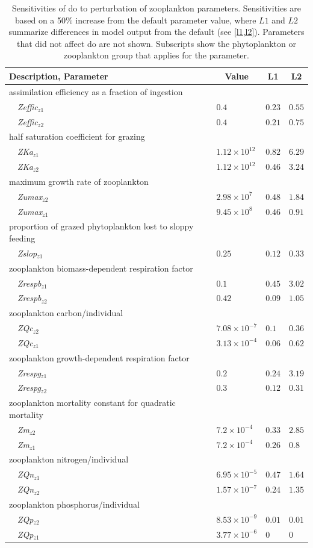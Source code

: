 \documentclass[letterpaper,12pt,oneside]{article}\usepackage[]{graphicx}\usepackage[]{color}
\begin{document}
\begin{table}[!tbp]
{\normalsize
\caption{Sensitivities of \ac{do} to perturbation of zooplankton parameters.  Sensitivities are based on a 50\% increase from the default parameter value, where $L1$ and $L2$ summarize differences in model output from the default (see \cref{l1,l2}).  Parameters that did not affect \ac{do} are not shown.  Subscripts show the phytoplankton or zooplankton group that applies for the parameter.\label{tab:zoopsens}} 
\begin{center}
\begin{tabular}{llll}
\hline\hline
\multicolumn{1}{l}{Description, Parameter}&\multicolumn{1}{c}{Value}&\multicolumn{1}{c}{L1}&\multicolumn{1}{c}{L2}\tabularnewline
\hline
{assimilation efficiency as a fraction of ingestion}&&&\tabularnewline
~~\textit{Zeffic$_{z1}$}&$0.4$&$0.23$&$0.55$\tabularnewline
~~\textit{Zeffic$_{z2}$}&$0.4$&$0.21$&$0.75$\tabularnewline
\hline
{half saturation coefficient for grazing}&&&\tabularnewline
~~\textit{ZKa$_{z1}$}&$1.12\times 10^{12}$&$0.82$&$6.29$\tabularnewline
~~\textit{ZKa$_{z2}$}&$1.12\times 10^{12}$&$0.46$&$3.24$\tabularnewline
\hline
{maximum growth rate of zooplankton}&&&\tabularnewline
~~\textit{Zumax$_{z2}$}&$2.98\times 10^{7}$&$0.48$&$1.84$\tabularnewline
~~\textit{Zumax$_{z1}$}&$9.45\times 10^{8}$&$0.46$&$0.91$\tabularnewline
\hline
{proportion of grazed phytoplankton lost to sloppy feeding}&&&\tabularnewline
~~\textit{Zslop$_{z1}$}&$0.25$&$0.12$&$0.33$\tabularnewline
\hline
{zooplankton biomass-dependent respiration factor}&&&\tabularnewline
~~\textit{Zrespb$_{z1}$}&$0.1$&$0.45$&$3.02$\tabularnewline
~~\textit{Zrespb$_{z2}$}&$0.42$&$0.09$&$1.05$\tabularnewline
\hline
{zooplankton carbon/individual}&&&\tabularnewline
~~\textit{ZQc$_{z2}$}&$7.08\times 10^{-7}$&$0.1$&$0.36$\tabularnewline
~~\textit{ZQc$_{z1}$}&$3.13\times 10^{-4}$&$0.06$&$0.62$\tabularnewline
\hline
{zooplankton growth-dependent respiration factor}&&&\tabularnewline
~~\textit{Zrespg$_{z1}$}&$0.2$&$0.24$&$3.19$\tabularnewline
~~\textit{Zrespg$_{z2}$}&$0.3$&$0.12$&$0.31$\tabularnewline
\hline
{zooplankton mortality constant for quadratic mortality}&&&\tabularnewline
~~\textit{Zm$_{z2}$}&$7.2\times 10^{-4}$&$0.33$&$2.85$\tabularnewline
~~\textit{Zm$_{z1}$}&$7.2\times 10^{-4}$&$0.26$&$0.8$\tabularnewline
\hline
{zooplankton nitrogen/individual}&&&\tabularnewline
~~\textit{ZQn$_{z1}$}&$6.95\times 10^{-5}$&$0.47$&$1.64$\tabularnewline
~~\textit{ZQn$_{z2}$}&$1.57\times 10^{-7}$&$0.24$&$1.35$\tabularnewline
\hline
{zooplankton phosphorus/individual}&&&\tabularnewline
~~\textit{ZQp$_{z2}$}&$8.53\times 10^{-9}$&$0.01$&$0.01$\tabularnewline
~~\textit{ZQp$_{z1}$}&$3.77\times 10^{-6}$&$0$&$0$\tabularnewline
\hline
\end{tabular}\end{center}}

\end{table}
\end{document}
